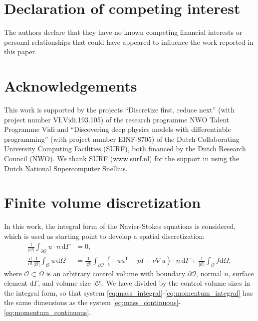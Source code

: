 \documentclass[preprint]{elsarticle}
\begin{document}
\section*{Declaration of competing interest}


The authors declare that they have no known competing financial interests or
personal relationships that could have appeared to influence the work reported
in this paper.

\section*{Acknowledgements}

This work is supported by the projects ``Discretize first, reduce next'' (with
project number VI.Vidi.193.105) of the research programme NWO Talent Programme
Vidi and ``Discovering deep physics models with differentiable programming''
(with project number EINF-8705) of the Dutch Collaborating University Computing
Facilities (SURF), both financed by the Dutch Research Council (NWO). We thank
SURF (www.surf.nl) for the support in using the Dutch National Supercomputer
Snellius.



\appendix

\section{Finite volume discretization} \label{sec:discretization}

In this work, the integral form of the Navier-Stokes equations is considered,
which is used as starting point to develop a spatial discretization:
\begin{align}
    \frac{1}{|\mathcal{O}|} \int_{\partial \mathcal{O}}
    u \cdot n \, \mathrm{d} \Gamma & = 0, \label{eq:mass_integral} \\
    \frac{\mathrm{d} }{\mathrm{d} t} \frac{1}{|\mathcal{O}|}
    \int_\mathcal{O} u \, \mathrm{d} \Omega
    & = \frac{1}{|\mathcal{O}|} \int_{\partial \mathcal{O}}
    \left( - u u^\mathsf{T} - p I + \nu \nabla u \right) \cdot n \,
    \mathrm{d} \Gamma +
    \frac{1}{|\mathcal{O}|}\int_\mathcal{O} f \mathrm{d} \Omega,
    \label{eq:momentum_integral}
\end{align}
where $\mathcal{O} \subset \Omega$ is an arbitrary control volume with boundary
$\partial \mathcal{O}$, normal $n$, surface element $\mathrm{d} \Gamma$, and
volume size $|\mathcal{O}|$. We have divided by the control volume sizes in the
integral form, so that system
\eqref{eq:mass_integral}-\eqref{eq:momentum_integral} has the same dimensions as
the system
\eqref{eq:mass_continuous}-\eqref{eq:momentum_continuous}.
\end{document}
